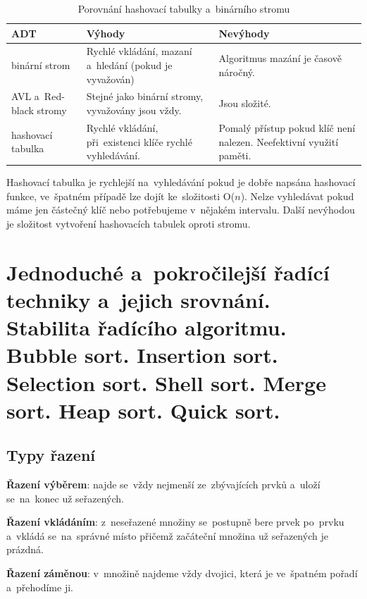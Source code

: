 \begin{table}[ht]
	\caption{Porovnání hashovací tabulky a~binárního stromu}
	\begin{tabularx}{\textwidth}{|l||X|X|}\hline
		ADT                    & Výhody                                                   & Nevýhody                                                            \\\hline\hline
		binární strom          & Rychlé vkládání, mazaní a~hledání (pokud je vyvažován)   & Algoritmus mazání je časově náročný.                                \\\hline
		AVL a~Red-black stromy & Stejné jako binární stromy, vyvažovány jsou vždy.        & Jsou složité.                                                       \\\hline
		hashovací tabulka      & Rychlé vkládání, při~existenci klíče rychlé vyhledávání. & Pomalý přístup pokud klíč není nalezen. Neefektivní využití paměti. \\\hline
	\end{tabularx}
\end{table}

Hashovací tabulka je rychlejší na~vyhledávání pokud je dobře napsána hashovací funkce, ve~špatném případě lze dojít ke~složitosti O(\( n \)). Nelze vyhledávat pokud máme jen částečný klíč nebo potřebujeme v~nějakém intervalu. Další nevýhodou je složitost vytvoření hashovacích tabulek oproti stromu.

\clearpage
\section{Jednoduché a~pokročilejší řadící techniky a~jejich srovnání. Stabilita řadícího algoritmu. Bubble sort. Insertion sort. Selection sort. Shell sort. Merge sort. Heap sort. Quick sort.}

\subsection{Typy řazení}

\textbf{Řazení výběrem}: najde se~vždy nejmenší ze~zbývajících prvků a~uloží se~na~konec už seřazených.

\textbf{Řazení vkládáním}: z~neseřazené množiny se~postupně bere prvek po~prvku a~vkládá se~na~správné místo přičemž začáteční množina už seřazených je prázdná.

\textbf{Řazení záměnou}: v~množině najdeme vždy dvojici, která je ve~špatném pořadí a~přehodíme ji.

